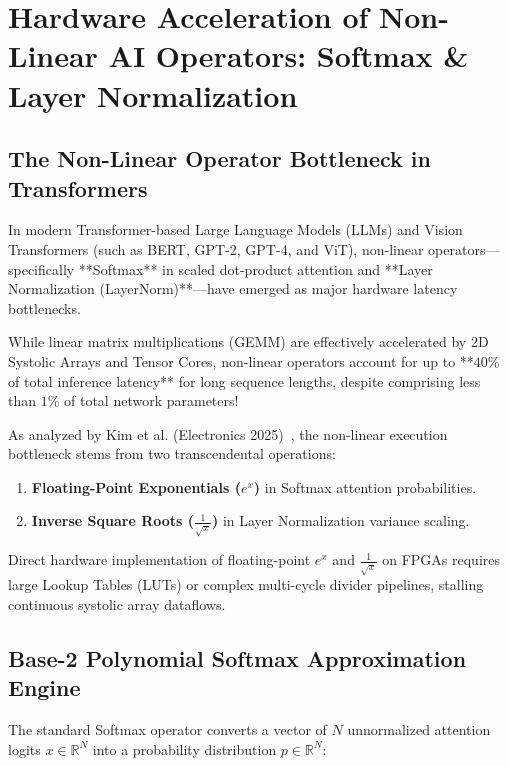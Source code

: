 \chapter{Hardware Acceleration of Non-Linear AI Operators: Softmax \& Layer Normalization}
\label{ch:nonlinear_ops}

\section{The Non-Linear Operator Bottleneck in Transformers}
In modern Transformer-based Large Language Models (LLMs) and Vision Transformers (such as BERT, GPT-2, GPT-4, and ViT), non-linear operators---specifically **Softmax** in scaled dot-product attention and **Layer Normalization (LayerNorm)**---have emerged as major hardware latency bottlenecks.

While linear matrix multiplications (GEMM) are effectively accelerated by 2D Systolic Arrays and Tensor Cores, non-linear operators account for up to **$40\%$ of total inference latency** for long sequence lengths, despite comprising less than $1\%$ of total network parameters!

As analyzed by Kim et al. (Electronics 2025)~\cite{kim2025hardware}, the non-linear execution bottleneck stems from two transcendental operations:
\begin{enumerate}[leftmargin=*]
    \item \textbf{Floating-Point Exponentials ($e^x$)} in Softmax attention probabilities.
    \item \textbf{Inverse Square Roots ($\frac{1}{\sqrt{x}}$)} in Layer Normalization variance scaling.
\end{enumerate}

Direct hardware implementation of floating-point $e^x$ and $\frac{1}{\sqrt{x}}$ on FPGAs requires large Lookup Tables (LUTs) or complex multi-cycle divider pipelines, stalling continuous systolic array dataflows.

\section{Base-2 Polynomial Softmax Approximation Engine}
The standard Softmax operator converts a vector of $N$ unnormalized attention logits $x \in \mathbb{R}^N$ into a probability distribution $p \in \mathbb{R}^N$:

